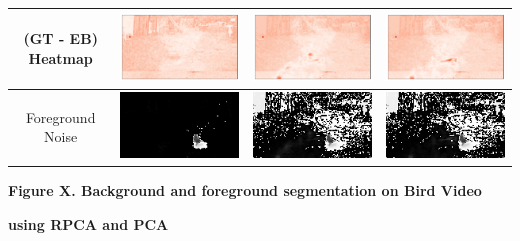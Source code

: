 \documentclass[11pt]{scrartcl} %
\theoremstyle{plain}
\begin{document}
\begin{minipage}{\linewidth}
\begin{tabular}{ | c | m{2.8cm} | m{2.8cm} | m{2.8cm} | }
	(GT - EB) Heatmap
	&
    \begin{minipage}{.3\textwidth}
      \includegraphics[width=\linewidth, width=25mm]{figures_video/crow/rpca/hm_0_015.png}
    \end{minipage}	
	&
    \begin{minipage}{.3\textwidth}
      \includegraphics[width=\linewidth, width=25mm]{figures_video/crow/pca/hm_0.png}
    \end{minipage}		
	&
    \begin{minipage}{.3\textwidth}
      \includegraphics[width=\linewidth, width=25mm]{figures_video/crow/pca2/hm_0.png}
    \end{minipage}		
	\\[6ex] \hline	
	
	Foreground Noise
	&
    \begin{minipage}{.3\textwidth}
      \includegraphics[width=\linewidth, width=25mm]{figures_video/crow/rpca/noise_0_015.png}
    \end{minipage}
	&
    \begin{minipage}{.3\textwidth}
      \includegraphics[width=\linewidth, width=25mm]{figures_video/crow/pca/noise_0.png}
    \end{minipage}
	&
    \begin{minipage}{.3\textwidth}
      \includegraphics[width=\linewidth, width=25mm]{figures_video/crow/pca2/noise_0.png}
    \end{minipage}
	\\[6ex] \hline	
	
  \end{tabular}

\bigskip
\centerline{\textbf{Figure X. Background and foreground segmentation on Bird Video }}
\centerline{\textbf{using RPCA and PCA}}
\egroup
\end{minipage}
\end{document}
